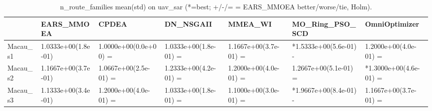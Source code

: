 \begin{table}[t]
\centering
\caption{n_route_families mean(std) on uav_sar (*=best; +/-/= = EARS_MMOEA better/worse/tie, Holm).}
\label{tab:uav_sar_n_route_families}
\begin{tabular}{lllllll}
\toprule
 & EARS\_MMOEA & CPDEA & DN\_NSGAII & MMEA\_WI & MO\_Ring\_PSO\_SCD & OmniOptimizer \\
\midrule
Macau\_s1 & 1.0333e+00(1.8e-01) & 1.0000e+00(0.0e+00) = & 1.0333e+00(1.8e-01) = & 1.1667e+00(3.7e-01) = & *1.5333e+00(5.6e-01) - & 1.2000e+00(4.0e-01) = \\
Macau\_s2 & 1.1667e+00(3.7e-01) & 1.0667e+00(2.5e-01) = & 1.2333e+00(4.2e-01) = & 1.2000e+00(4.0e-01) = & 1.2667e+00(5.1e-01) = & *1.3000e+00(4.6e-01) = \\
Macau\_s3 & 1.1333e+00(3.4e-01) & 1.2000e+00(4.0e-01) = & 1.0333e+00(1.8e-01) = & 1.1000e+00(3.0e-01) = & *1.9667e+00(8.4e-01) - & 1.1667e+00(3.7e-01) = \\
\bottomrule
\end{tabular}
\end{table}
